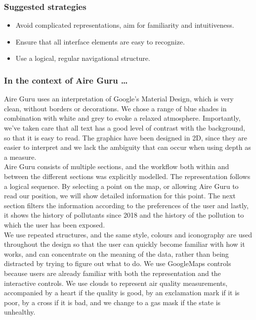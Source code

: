 \subsubsection*{Suggested strategies} 

\begin{itemize}
    \item Avoid complicated representations, aim for familiarity and intuitiveness.

    \item Ensure that all interface elements are easy to recognize.
    
    \item Use a logical, regular navigational structure.
\end{itemize}

\subsubsection*{In the context of Aire Guru \ldots}

Aire Guru uses an interpretation of Google's Material Design, which is very clean, without borders or decorations.
We chose a range of blue shades in combination with white and grey to evoke a relaxed atmosphere.
Importantly, we've taken care that all text has a good level of contrast with the background, so that it is easy to read.
The graphics have been designed in 2D, since they are easier to interpret and we lack the ambiguity that can occur when using depth as a measure.\\

Aire Guru consists of multiple sections, and the workflow both within and between the different sections was explicitly modelled.
The representation follows a logical sequence.
By selecting a point on the map, or allowing Aire Guru to read our position, we will show detailed information for this point.
The next section filters the information according to the preferences of the user and lastly, it shows the history of pollutants since 2018 and the history of the pollution to which the user has been exposed.\\

We use repeated structures, and the same style, colours and iconography are used throughout the design so that the user can quickly become familiar with how it works, and can
concentrate on the meaning of the data, rather than being distracted by trying to figure out what to do.
We use GoogleMaps controls because users are already familiar with both the representation and the interactive controls.
We use clouds to represent air quality measurements, accompanied by a heart if the quality is good, by an exclamation mark if it is poor, by a cross if it is bad, and we change to a gas mask if the state is unhealthy.\\

